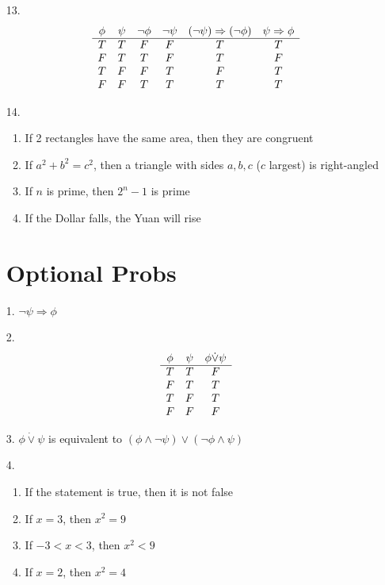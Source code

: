 \documentclass[11pt]{exam}
\begin{document}
\begin{enumerate}[leftmargin=0pt]
\item[13.]
\begin{displaymath}
    \begin{array}{c c c c c c}
        \phi & \psi & \neg \phi & \neg \psi & (\neg \psi) \Rightarrow (\neg \phi) & \psi \Rightarrow \phi \\
        \hline
        T & T & F & F & T & T \\
        F & T & T & F & T & F \\
        T & F & F & T & F & T \\
        F & F & T & T & T & T
    \end{array}
\end{displaymath}

\item[14.]
\begin{enumerate}[label=(\alph*)]
    \item If 2 rectangles have the same area, then they are congruent
    \item If $a^2 + b^2 = c^2$, then a triangle with sides $a, b, c$ ($c$ largest) is right-angled
    \item If $n$ is prime, then $2^n - 1$ is prime
    \item If the Dollar falls, the Yuan will rise
\end{enumerate}

\section{Optional Probs}

\item[1.] $\neg \psi \Rightarrow \phi$

\item[2.]
\begin{displaymath}
    \begin{array}{c c c}
         \phi & \psi & \phi \dot \lor \psi \\
         \hline
         T & T & F \\
         F & T & T \\
         T & F & T \\
         F & F & F
    \end{array}
\end{displaymath}

\item[3.] $\phi \dot \lor \psi$ is equivalent to $(\phi \land \neg \psi) \lor (\neg \phi \land \psi)$

\item[4.]
\begin{enumerate}[label=(\alph*)]
    \item If the statement is true, then it is not false
    \item If $x = 3$, then $x^2 = 9$
    \item If $-3 < x < 3$, then $x^2 < 9$
    \item If $x = 2$, then $x^2 = 4$
\end{enumerate}


\end{enumerate}
\end{document}
